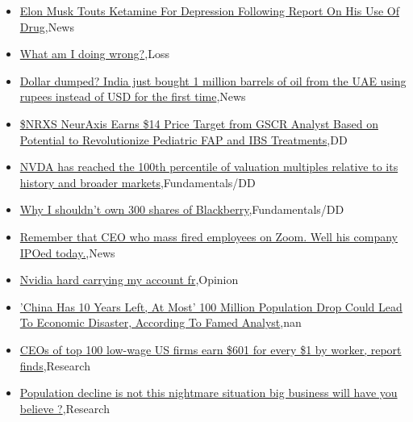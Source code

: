 \documentclass{article}%
\begin{document}
%
\begin{itemize}%
\item%
\href{https://reddit.com/r/wallstreetbets/comments/161rqlk/elon\_musk\_touts\_ketamine\_for\_depression\_following/}{Elon Musk Touts Ketamine For Depression Following Report On His Use Of Drug},News%
\item%
\href{https://reddit.com/r/wallstreetbets/comments/161p255/what\_am\_i\_doing\_wrong/}{What am I doing wrong?},Loss%
\item%
\href{https://reddit.com/r/wallstreetbets/comments/161ot8c/dollar\_dumped\_india\_just\_bought\_1\_million\_barrels/}{Dollar dumped? India just bought 1 million barrels of oil from the UAE using rupees instead of USD for the first time},News%
\item%
\href{https://reddit.com/r/Baystreetbets/comments/16119rp/nrxs\_neuraxis\_earns\_14\_price\_target\_from\_gscr/}{\$NRXS NeurAxis Earns \$14 Price Target from GSCR Analyst Based on Potential to Revolutionize Pediatric FAP and IBS Treatments},DD%
\item%
\href{https://reddit.com/r/StockMarket/comments/161ctf8/nvda\_has\_reached\_the\_100th\_percentile\_of/}{NVDA has reached the 100th percentile of valuation multiples relative to its history and broader markets},Fundamentals/DD%
\item%
\href{https://reddit.com/r/StockMarket/comments/1615hak/why\_i\_shouldnt\_own\_300\_shares\_of\_blackberry/}{Why I shouldn't own 300 shares of Blackberry},Fundamentals/DD%
\item%
\href{https://reddit.com/r/StockMarket/comments/1614it1/remember\_that\_ceo\_who\_mass\_fired\_employees\_on/}{Remember that CEO who mass fired employees on Zoom. Well his company IPOed today.},News%
\item%
\href{https://reddit.com/r/StockMarket/comments/160a21w/nvidia\_hard\_carrying\_my\_account\_fr/}{Nvidia hard carrying my account fr},Opinion%
\item%
\href{https://reddit.com/r/Economics/comments/161rfb2/china\_has\_10\_years\_left\_at\_most\_100\_million/}{'China Has 10 Years Left, At Most'  100 Million Population Drop Could Lead To Economic Disaster, According To Famed Analyst},nan%
\item%
\href{https://reddit.com/r/Economics/comments/1618zd1/ceos\_of\_top\_100\_lowwage\_us\_firms\_earn\_601\_for/}{CEOs of top 100 low-wage US firms earn \$601 for every \$1 by worker, report finds},Research%
\item%
\href{https://reddit.com/r/Economics/comments/1616uyc/population\_decline\_is\_not\_this\_nightmare/}{Population decline is not this nightmare situation big business will have you believe ?},Research%
\end{itemize}%
\end{document}
